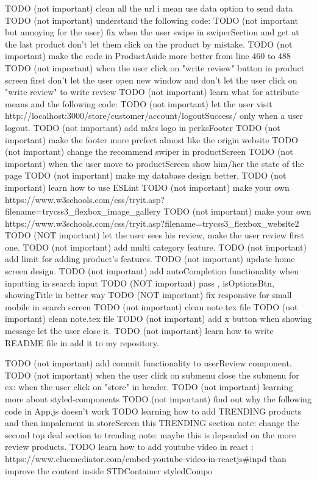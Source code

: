 TODO (not important) clean all the url i mean use data option to send data 
TODO (not important) understand the following code:
TODO (not important but annoying for the user) fix when the user swipe in swiperSection and get at the last product don't let them click on the product by mistake.
TODO (not important) make the code in ProductAside more better from line 460 to 488
TODO (not important) when the user click on "write review" button in product screen first don't let the user open new window and don't let the user click on "write review" to write review
TODO (not important) learn what for attribute means and the following code:
TODO (not important) let the user visit http://localhost:3000/store/customer/account/logoutSuccess/ only when a user logout.
TODO (not important) add m&s logo in perksFooter
TODO (not important) make the footer more prefect almost like the origin website
TODO (not important) change the recommend swiper in productScreen
TODO (not important) when the user move to productScreen show him/her the state of the page
TODO (not important) make my database design better.
TODO (not important) learn how to use ESLint
TODO (not important) make your own https://www.w3schools.com/css/tryit.asp?filename=trycss3_flexbox_image_gallery
TODO (not important) make your own https://www.w3schools.com/css/tryit.asp?filename=trycss3_flexbox_website2
TODO (NOT important) let the user sees his review, make the user review first one.
TODO (not important) add multi category feature.
TODO (not important) add limit for adding product's features. 
TODO (not important) update home screen design.
TODO (not important) add autoCompletion functionality when inputting in search input
TODO (NOT important) pass , isOptionsBtn, showingTitle in better way 
TODO (NOT important) fix responsive for small mobile in search screen
TODO (not important) clean note.tex file
TODO (not important) clean note.tex file
TODO (not important) add x button when showing message let the user close it. 
TODO (not important) learn how to write README file in add it to my repository.

TODO (not important) add commit functionality to userReview component.
TODO (not important) when the user click on submenu close the submenu for ex: when the user click on "store" in header.
TODO (not important) learning more about styled-components
TODO (not important) find out why the following code in App.js doesn't work
TODO   learning how to add TRENDING products and then impalement in storeScreen this TRENDING section
      note: change the second top deal section to trending 
      note: maybe this is depended on the more review products.
TODO learn how to add youtube video in react : 
https://www.cluemediator.com/embed-youtube-video-in-reactjs#inpd
than improve the content inside STDContainer styledCompo 